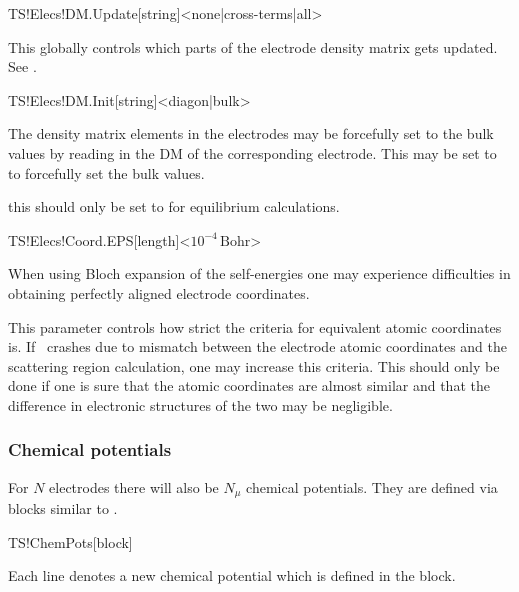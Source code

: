 \begin{fdfentry}{TS!Elecs!DM.Update}[string]<none|cross-terms|all>

  This globally controls which parts of the electrode density matrix
  gets updated. 
  See .
  
\end{fdfentry}

\begin{fdfentry}{TS!Elecs!DM.Init}[string]<diagon|bulk>

  The density matrix elements in the electrodes may be forcefully set
  to the bulk values by reading in the DM of the corresponding
  electrode. This may be set to  to forcefully set the bulk
  values.

  \note this should only be set to  for equilibrium
  calculations. 
  
\end{fdfentry}

\begin{fdfentry}{TS!Elecs!Coord.EPS}[length]<$10^{-4}\,\mathrm{Bohr}$>

  When using Bloch expansion of the self-energies one may experience
  difficulties in obtaining perfectly aligned electrode coordinates.

  This parameter controls how strict the criteria for equivalent
  atomic coordinates is. If \tsiesta\ crashes due to mismatch between
  the electrode atomic coordinates and the scattering region
  calculation, one may increase this criteria. This should only be
  done if one is sure that the atomic coordinates are almost similar
  and that the difference in electronic structures of the two may be
  negligible.
  
\end{fdfentry}


\subsubsection{Chemical potentials}
\label{sec:ts:chem-pot}

For $N$ electrodes there will also be $N_\mu$ chemical
potentials. They are defined via blocks similar to .

\begin{fdfentry}{TS!ChemPots}[block]
  
  Each line denotes a new chemical potential which is 
  defined in the  block.
  
\end{fdfentry}

